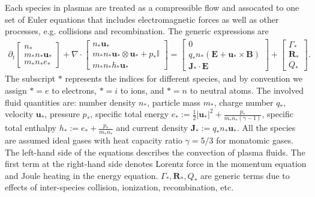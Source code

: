 \documentclass{article}
\begin{document}
Each species in plasmas are treated as a compressible flow and assocated to one set of Euler equations that includes electromagnetic forces as well as other processes, e.g. collisions and recombination. The generic expressions are
\begin{align} \label{equ:euler_}
    \partial_t
    \begin{bmatrix}
    n_* \\
    m_*n_* \mathbf{u}_* \\
    m_*n_* e_*
    \end{bmatrix}
    + \nabla \cdot
    \begin{bmatrix}
    n_* \mathbf{u}_* \\
    m_*n_* \mathbf{u}_* \otimes \mathbf{u}_* + p_*\mathbb{I} \\
    m_*n_* h_* \mathbf{u}_*
    \end{bmatrix}
    =
    \begin{bmatrix}
    0 \\
    q_*n_*(\mathbf{E} + \mathbf{u}_* \times \mathbf{B}) \\
    \mathbf{J}_* \cdot \mathbf{E}
    \end{bmatrix}
    +
    \begin{bmatrix}
    \Gamma_* \\
    \mathbf{R}_* \\
    Q_*
    \end{bmatrix}.
\end{align}
The subscript $*$ represents the indices for different species, and by convention we assign $* = e$ to electrons, $* = i$ to ions, and $* = n$ to neutral atoms. The involved fluid quantities are: number density $n_*$, particle mass $m_*$,  charge number $q_*$, velocity $\mathbf{u}_*$, pressure $p_*$, specific total energy $e_* := \frac{1}{2}|\mathbf{u}_*|^2 + \frac{p_*}{m_*n_*(\gamma - 1)}$, specific total enthalpy $h_* := e_* + \frac{p_*}{m_*n_*}$ and current density $\mathbf{J}_* := q_*n_*\mathbf{u}_*$. All the species are assumed ideal gases with heat capacity ratio $\gamma=5/3$ for monatomic gases. The left-hand side of the equations describes the convection of plasma fluids. The first term at the right-hand side denotes Lorentz force in the momentum equation and Joule heating in the energy equation. $\Gamma_*, \mathbf{R}_*, Q_*$ are generic terms due to effects of inter-species collision, ionization, recombination, etc. 
\end{document}
